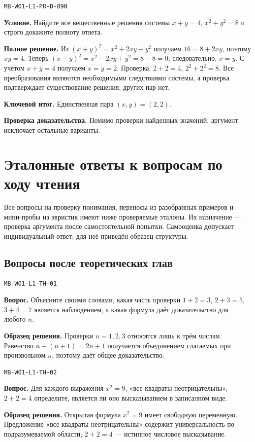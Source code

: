 \documentclass[11pt,a4paper,openany]{book}
\newcommand{\muid}[1]{\texttt{\footnotesize #1}}
\begin{document}
\muid{MB-W01-L1-PR-D-090}\par

\textbf{Условие.} Найдите все вещественные решения системы $x+y=4$, $x^2+y^2=8$ и строго докажите полноту ответа.\par

\textbf{Полное решение.} Из $(x+y)^2=x^2+2xy+y^2$ получаем $16=8+2xy$, поэтому $xy=4$. Теперь $(x-y)^2=x^2-2xy+y^2=8-8=0$, следовательно, $x=y$. С учётом $x+y=4$ получаем $x=y=2$. Проверка: $2+2=4$, $2^2+2^2=8$. Все преобразования являются необходимыми следствиями системы, а проверка подтверждает существование решения; других пар нет.


\begin{learnbox}\textbf{Ключевой итог.} Единственная пара $(x,y)=(2,2)$.\par \textbf{Проверка доказательства.} 
Помимо проверки найденных значений, аргумент исключает остальные варианты. 
\end{learnbox}

\chapter{Эталонные ответы к вопросам по ходу чтения}
Все вопросы на проверку понимания, переносы из разобранных примеров и мини-пробы из эвристик имеют ниже проверяемые эталоны. Их назначение — проверка аргумента после самостоятельной попытки. Самооценка допускает индивидуальный ответ; для неё приведён образец структуры.

\section{Вопросы после теоретических глав}

\noindent\muid{MB-W01-L1-TH-01}\par \textbf{Вопрос.} Объясните своими словами, какая часть проверки $1+2=3$, $2+3=5$, $3+4=7$ является наблюдением, а какая формула даёт доказательство для любого $n$.\par 
\textbf{Образец решения.} Проверки $n=1,2,3$ относятся лишь к трём числам. Равенство $n+(n+1)=2n+1$ получается объединением слагаемых при произвольном $n$, поэтому даёт общее доказательство.\medskip

\noindent\muid{MB-W01-L1-TH-02}\par \textbf{Вопрос.} Для каждого выражения $x^2=9$, «все квадраты неотрицательны», $2+2=4$ определите, является ли оно высказыванием в записанном виде.\par 
\textbf{Образец решения.} Открытая формула $x^2=9$ имеет свободную переменную. Предложение «все квадраты неотрицательны» содержит универсальность по подразумеваемой области; $2+2=4$ — истинное числовое высказывание.\medskip
\end{document}
